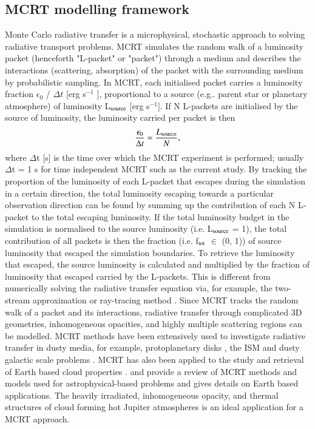 \documentclass{aa}
\begin{document}
\subsection{MCRT modelling framework}

Monte Carlo radiative transfer is a microphysical, stochastic approach to solving radiative transport problems. 
MCRT simulates the random walk of a luminosity packet (henceforth "L-packet" or "packet") through a medium and describes the interactions (scattering, absorption) of the packet with the surrounding medium by probabilistic sampling.
In MCRT, each initialised packet carries a luminosity fraction $\epsilon_{0}$ / $\Delta t$ [erg s$^{-1}$ ], proportional to a source (e.g.. parent star or planetary atmosphere) of luminosity L$_{\rm source}$ [erg s$^{-1}$].
If N L-packets are initialised by the source of luminosity, the luminosity carried per packet is then \citep[e.g.][]{Lucy1999}
\begin{equation}
\frac{\epsilon_{0}}{\Delta t} = \frac{L_{\rm source}}{N}, 
\label{eq:photon_energy}
\end{equation}
where $\Delta$t [s] is the time over which the MCRT experiment is performed; usually $\Delta$t  = 1 s for time independent MCRT such as the current study.
By tracking the proportion of the luminosity of each L-packet that escapes during the simulation in a certain direction, the total luminosity escaping towards a particular observation direction can be found by summing up the contribution of each N L-packet to the total escaping luminosity.
If the total luminosity budget in the simulation is normalised to the source luminosity (i.e. L$_{\rm source}$ = 1), the total contribution of all packets is then the fraction (i.e. f$_{\rm tot}$ $\in$ (0, 1)) of source luminosity that escaped the simulation boundaries.
To retrieve the luminosity that escaped, the source luminosity is calculated and multiplied by the fraction of luminosity that escaped carried by the L-packets.
This is different from numerically solving the radiative transfer equation via, for example, the two-stream approximation \citep[e.g.][]{Toon1986, Marley1999b, Fortney2006} or ray-tracing method \citep[e.g.][]{Rijkhorst2006}.
Since MCRT tracks the random walk of a packet and its interactions, radiative transfer through complicated 3D geometries, inhomogeneous opacities, and highly multiple scattering regions can be modelled.
MCRT methods have been extensively used to investigate radiative transfer in dusty media, for example, protoplanetary disks \citep[e.g.][]{Whitney2003, Harries2004, Pinte2006, Min2009}, the ISM \citep[e.g.][]{Robitaille2011} and dusty galactic scale problems \citep[e.g.][]{Wood2000}.
MCRT has also been applied to the study and retrieval of Earth based cloud properties \citep[e.g.][]{Mayer2009,Stap2016}.
\citet{Whitney2011} and \citet{Steinacker2013} provide a review of MCRT methods and models used for astrophysical-based problems and \citet{Mayer2009} gives details on Earth based applications.
The heavily irradiated, inhomogeneous opacity, and thermal structures of cloud forming hot Jupiter atmospheres is an ideal application for a MCRT approach.
\end{document}
